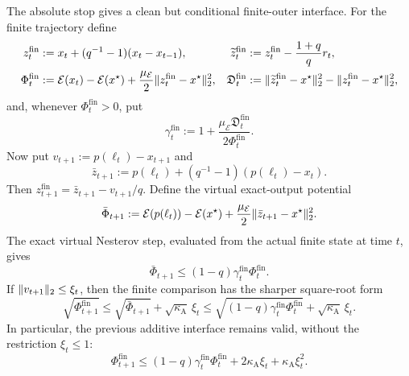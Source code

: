 The absolute stop gives a clean but conditional finite-outer interface.
For the finite trajectory define
\begin{align*}
 z_t^{\mathrm{fin}}
 &:=x_t+(q^{-1}-1)(x_t-x_{t-1}),
 &\widetilde z_t^{\mathrm{fin}}
 &:=z_t^{\mathrm{fin}}-\frac{1+q}{q}r_t,\\
 \Phi_t^{\mathrm{fin}}
 &:=\mathcal E(x_t)-\mathcal E(x^\star)
   +\frac{\mu_{\mathcal E}}2
       \lVert z_t^{\mathrm{fin}}-x^\star\rVert_2^2,
 &\mathfrak D_t^{\mathrm{fin}}
 &:=\lVert\widetilde z_t^{\mathrm{fin}}-x^\star\rVert_2^2
      -\lVert z_t^{\mathrm{fin}}-x^\star\rVert_2^2,
\end{align*}
and, whenever $\Phi_t^{\mathrm{fin}}>0$, put
\begin{equation*}
 \gamma_t^{\mathrm{fin}}
 :=1+\frac{\mu_{\mathcal E}\mathfrak D_t^{\mathrm{fin}}}
          {2\Phi_t^{\mathrm{fin}}}.
\end{equation*}
Now put $v_{t+1}:=p(\ell_t)-x_{t+1}$ and
\begin{equation*}
 \bar z_{t+1}:=p(\ell_t)
   +(q^{-1}-1)(p(\ell_t)-x_t).
\end{equation*}
Then $z_{t+1}^{\mathrm{fin}}=\bar z_{t+1}-v_{t+1}/q$.  Define the virtual
exact-output potential
\begin{equation*}
 \bar\Phi_{t+1}
 :=\mathcal E(p(\ell_t))-\mathcal E(x^\star)
   +\frac{\mu_{\mathcal E}}2
      \lVert\bar z_{t+1}-x^\star\rVert_2^2.
\end{equation*}
The exact virtual Nesterov step, evaluated from the actual finite state at
time $t$, gives
\begin{equation}
 \bar\Phi_{t+1}
 \leq(1-q)\gamma_t^{\mathrm{fin}}\Phi_t^{\mathrm{fin}}.
 \label{eq:aesp-cd-virtual-inner-potential}
\end{equation}
If $\lVert v_{t+1}\rVert_2\leq\xi_t$, then the finite comparison has the sharper
square-root form
\begin{equation}
 \sqrt{\Phi_{t+1}^{\mathrm{fin}}}
 \leq\sqrt{\bar\Phi_{t+1}}+\sqrt{\kappa_{\mathrm A}}\,\xi_t
 \leq
 \sqrt{(1-q)\gamma_t^{\mathrm{fin}}\Phi_t^{\mathrm{fin}}}
 +\sqrt{\kappa_{\mathrm A}}\,\xi_t.
 \label{eq:aesp-cd-finite-inner-root-potential}
\end{equation}
In particular, the previous additive interface remains valid, without the
restriction $\xi_t\leq1$:
\begin{equation}
 \Phi_{t+1}^{\mathrm{fin}}
 \leq(1-q)\gamma_t^{\mathrm{fin}}\Phi_t^{\mathrm{fin}}
      +2\kappa_{\mathrm A}\xi_t
      +\kappa_{\mathrm A}\xi_t^2.
 \label{eq:aesp-cd-finite-inner-potential}
\end{equation}

